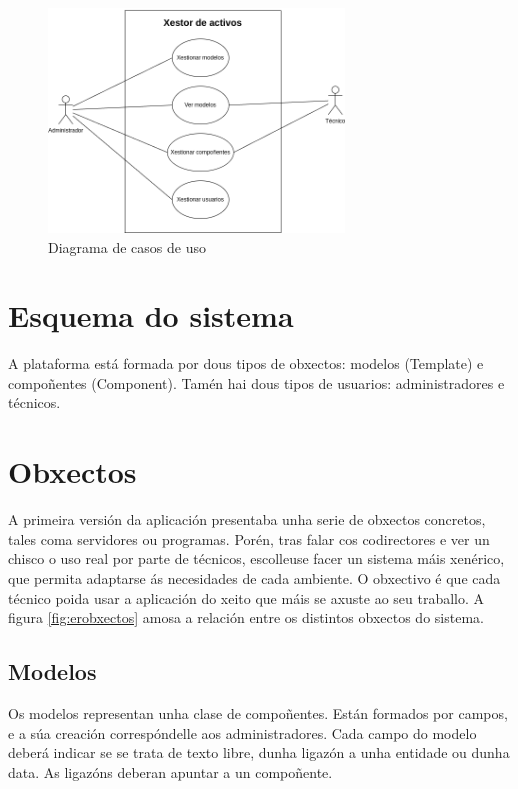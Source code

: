 \begin{figure}
	\hspace*{-3cm}
	\centering
	\includegraphics[width=0.7\textwidth]{imaxes/casos_uso.drawio.png}
	\caption{Diagrama de casos de uso}
	\label{fig:casosuso}
\end{figure}

\section{Esquema do sistema}

A plataforma está formada por dous tipos de obxectos: modelos (\Gls{Template}) e compoñentes (\Gls{Component}). Tamén hai dous tipos de usuarios: administradores e técnicos.

\section{Obxectos}

A primeira versión da aplicación presentaba unha serie de obxectos concretos, tales coma servidores ou programas. Porén, tras falar cos codirectores e ver un chisco o uso real por parte de técnicos, escolleuse facer un sistema máis xenérico, que permita adaptarse ás necesidades de cada ambiente. O obxectivo é que cada técnico poida usar a aplicación do xeito que máis se axuste ao seu traballo. A figura \ref{fig:erobxectos} amosa a relación entre os distintos obxectos do sistema.

\subsection{Modelos}

Os modelos representan unha clase de compoñentes. Están formados por campos, e a súa creación correspóndelle aos administradores. Cada campo do modelo deberá indicar se se trata de texto libre, dunha ligazón a unha entidade ou dunha data. As ligazóns deberan apuntar a un compoñente.

